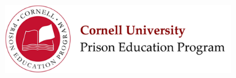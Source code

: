 \documentclass[12pt]{exam}
\begin{document}


\begin{center}
\includegraphics[width=10cm]{../images/logo.png}
\end{center}

\begin{center}
\end{center}
\vspace{0.5in}


\clearpage
\end{document}
